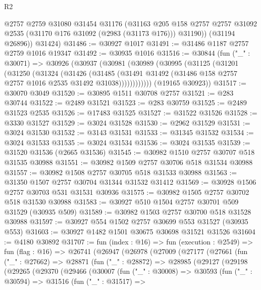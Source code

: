 \begin{lexlean}{R2}
\begin{coremodule}
          @2757
          @2759
          @31080
          @31454
          @31176
          (@31163
            @205
            @158
            @2757
            @2757
            @31092
            @2535
            (@31170 @176 @31092 (@2983 (@31173 @176)))
            @31190))
        (@31194 @26896))
      @31424)
@31486 := @30927 @1017
@31491 := @31486 @1187 @2757 @2759 @1016 @19347
@31492 := @30935 @1016
@31516 := @30844
    (fun ("_" : @30071) =>
    @30926
      (@30937
        (@30981
          (@30989
            (@30995
              (@31125
                (@31201
                  (@31250
                    (@31324
                      (@31426
                        (@31485
                          (@31491
                            @31492
                            (@31486 @158 @2757 @2757 @1016 @2535 @31492 @31038))))))))))))
      (@19165 @30923))
@31517 := @30070 @3049
@31520 := @30895 @1511 @30708 @2757
@31521 := @283 @30744
@31522 := @2489 @31521
@31523 := @283 @30759
@31525 := @2489 @31523 @2535
@31526 := @17483 @31525
@31527 := @31522 @31526
@31528 := @3330 @31527
@31529 := @3024 @31528
@31530 := @2962 @31529
@31531 := @3024 @31530
@31532 := @3143 @31531
@31533 := @31345 @31532
@31534 := @3024 @31533
@31535 := @3024 @31534
@31536 := @3024 @31535
@31539 := @31520 @31536 (@2665 @31536)
@31545 := @30982 @1510 @2757 @30707 @518 @31535 @30988
@31551 := @30982 @1509 @2757 @30706 @518 @31534 @30988
@31557 := @30982 @1508 @2757 @30705 @518 @31533 @30988
@31563 := @31350 @1507 @2757 @30704 @31344 @31532 @31412
@31569 := @30928 @1506 @2757 @30703 @531 @31531 @30936
@31575 := @30982 @1505 @2757 @30702 @518 @31530 @30988
@31583 := @30927 @510 @1504 @2757 @30701 @509 @31529 (@30935 @509)
@31589 := @30982 @1503 @2757 @30700 @518 @31528 @30988
@31597 := @30927 @554 @1502 @2757 @30699 @553 @31527 (@30935 @553)
@31603 := @30927 @1482 @1501 @30675 @30698 @31521 @31526
@31604 := @4180 @30892
@31707 := fun (index : @16) =>
  fun (execution : @2549) =>
  fun (flag : @16) =>
  @26741
    (@26947
      (@26978
        (@27009
          (@27177
            (@27661
              (fun ("_" : @27662) =>
              @28871
                (fun ("_" : @28872) =>
                @28985
                  (@29127
                    (@29198
                      (@29265
                        (@29370
                          (@29466
                            (@30007
                              (fun ("_" : @30008) =>
                              @30593
                                (fun ("_" : @30594) =>
                                @31516
                                  (fun ("_" : @31517) =>

\end{coremodule}
\end{lexlean}
